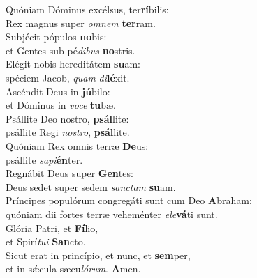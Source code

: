 \evenverse Quóniam Dóminus excélsus, ter\textbf{rí}bilis:~\*\\
\evenverse Rex magnus super \textit{om}\textit{nem} \textbf{ter}ram.\\
\oddverse Subjécit pópulos \textbf{no}bis:~\*\\
\oddverse et Gentes sub pé\textit{di}\textit{bus} \textbf{no}stris.\\
\evenverse Elégit nobis hereditátem \textbf{su}am:~\*\\
\evenverse spéciem Jacob, \textit{quam} \textit{di}\textbf{lé}xit.\\
\oddverse Ascéndit Deus in \textbf{jú}bilo:~\*\\
\oddverse et Dóminus in \textit{vo}\textit{ce} \textbf{tu}bæ.\\
\evenverse Psállite Deo nostro, \textbf{psál}lite:~\*\\
\evenverse psállite Regi \textit{no}\textit{stro}, \textbf{psál}lite.\\
\oddverse Quóniam Rex omnis terræ \textbf{De}us:~\*\\
\oddverse psállite \textit{sa}\textit{pi}\textbf{én}ter.\\
\evenverse Regnábit Deus super \textbf{Gen}tes:~\*\\
\evenverse Deus sedet super sedem \textit{san}\textit{ctam} \textbf{su}am.\\
\oddverse Príncipes populórum congregáti sunt cum Deo \textbf{A}braham:~\*\\
\oddverse quóniam dii fortes terræ veheménter \textit{e}\textit{le}\textbf{vá}ti sunt.\\
\evenverse Glória Patri, et \textbf{Fí}lio,~\*\\
\evenverse et Spirí\textit{tu}\textit{i} \textbf{San}cto.\\
\oddverse Sicut erat in princípio, et nunc, et \textbf{sem}per,~\*\\
\oddverse et in sǽcula sæcu\textit{ló}\textit{rum}. \textbf{A}men.\\
